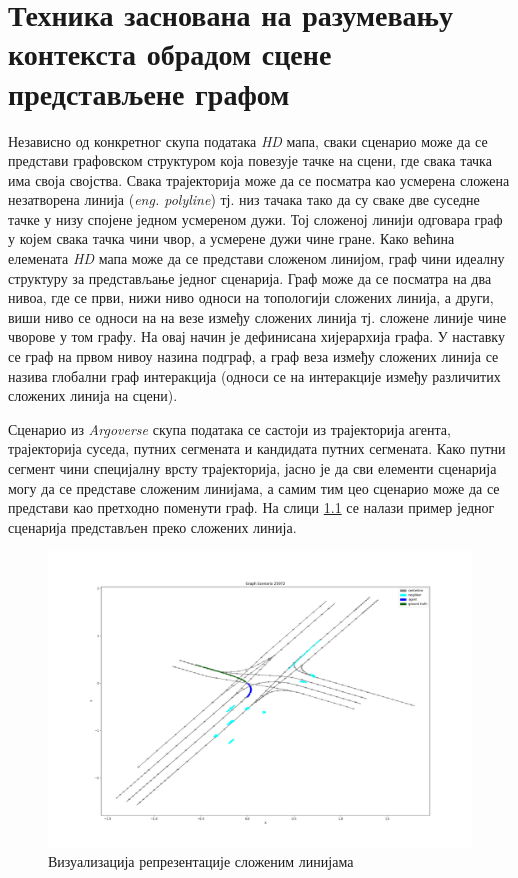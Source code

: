 \documentclass[11pt,oneside]{memoir}
\begin{document}
\chapter{Техника заснована на разумевању контекста обрадом сцене представљене графом}
\label{chp:razrada}

Независно од конкретног скупа података \textit{HD} мапа, сваки сценарио може да се представи графовском структуром која повезује тачке на сцени, где
свака тачка има своја својства. Свака трајекторија може да се посматра као усмерена сложена незатворена линија (\textit{eng. polyline}) тј. 
низ тачака тако да су сваке две суседне тачке у низу спојене једном усмереном дужи. Тој сложеној линији одговара граф у којем свака тачка
чини чвор, а усмерене дужи чине гране. Како већина елемената \textit{HD} мапа може да се представи сложеном линијом, граф чини идеалну структуру
за представљање једног сценарија. Граф може да се посматра на два нивоа, где се први, нижи ниво односи на топологији сложених линија, а други, виши ниво 
се односи на на везе између сложених линија тј. сложене линије чине чворове у том графу. На овај начин је дефинисана хијерархија графа. 
У наставку се граф на првом нивоу назина подграф, а граф веза између сложених линија се назива глобални граф интеракција (односи се на интеракције
између различитих сложених линија на сцени).

Сценарио из \textit{Argoverse} скупа података се састоји из трајекторија агента, трајекторија суседа, путних сегмената и кандидата путних сегмената.
Како путни сегмент чини специјалну врсту трајекторија, јасно је да сви елементи сценарија могу да се представе сложеним линијама, а самим тим
цео сценарио може да се представи као претходно поменути граф. На слици \ref{polylines-representation} се налази пример једног сценарија
представљен преко сложених линија.

\begin{figure}[H]
  \includegraphics[width=1.0\textwidth]{images/polylines-representation.png}
  \caption{Визуализација репрезентације сложеним линијама}
  \label{polylines-representation}
\end{figure}
\end{document}
